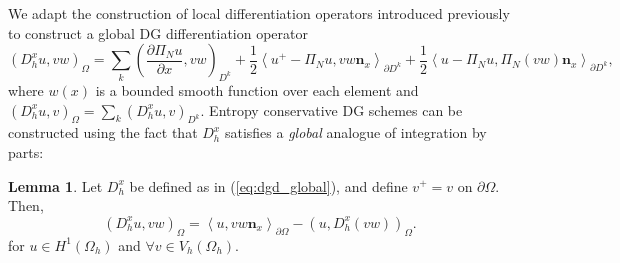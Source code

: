 \documentclass[preprint,10pt]{article}
\theoremstyle{definition}
\theoremstyle{lemma}
\newtheorem{lemma}{Lemma}
\theoremstyle{theorem}
\theoremstyle{assumption}
\newcommand{\pd}[2]{\frac{\partial#1}{\partial#2}}
\newcommand{\LRp}[1]{\left( #1 \right)}
\newcommand{\LRa}[1]{\left\langle #1 \right\rangle}
\newcommand{\Oh}{{\Omega_h}}
\begin{document}
We adapt the construction of local differentiation operators introduced previously to construct a global DG differentiation operator
\begin{equation}
\LRp{D^x_h u,vw}_{\Omega} = \sum_k \LRp{\pd{ \Pi_N u}{x},vw}_{D^k} + \frac{1}{2}{\LRa{{u^+ - \Pi_N u}, vw\bm{n}_x}_{\partial D^k} + \frac{1}{2}\LRa{{u - \Pi_Nu },\Pi_N(vw) \bm{n}_x}_{\partial D^k}},
\label{eq:dgd_global}
\end{equation}
where $w(x)$ is a bounded smooth function over each element and $\LRp{D^x_h u,v}_{\Omega} = \sum_k \LRp{D^x_h u,v}_{D^k}$.  
Entropy conservative DG schemes can be constructed using the fact that $D^x_h$ satisfies a \textit{global} analogue of integration by parts:
\begin{lemma}
\label{lemma:ibp}
Let $D^x_h$ be defined as in (\ref{eq:dgd_global}), and define $v^+ = v$ on $\partial \Omega$.  Then, 
\[
\LRp{D^x_h u,vw}_{\Omega} = \LRa{u,vw\bm{n}_x}_{\partial \Omega} - \LRp{u,D^x_h (vw)}_{\Omega}.
\]
for $u \in H^1(\Oh)$ and $\forall v\in V_h(\Omega_h)$.  
\end{lemma}
\end{document}
